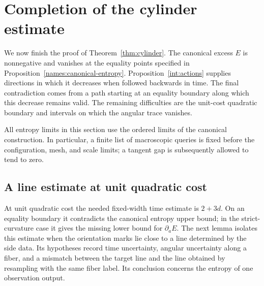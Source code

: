 \section{Completion of the cylinder estimate}\label{act:section}

We now finish the proof of Theorem~\ref{thm:cylinder}.
The canonical excess $E$ is nonnegative and vanishes at the equality
points specified in Proposition~\ref{names:canonical-entropy}.
Proposition~\ref{int:actions} supplies directions in which it decreases
when followed backwards in time. The final contradiction comes from a
path starting at an equality boundary along which this decrease remains
valid. The remaining difficulties are the unit-cost quadratic boundary
and intervals on which the angular trace vanishes.

All entropy limits in this section use the ordered limits of the canonical
construction.  In particular, a finite
list of macroscopic queries is fixed before the configuration, mesh, and
scale limits; a tangent gap is subsequently allowed to tend to zero.

\subsection{A line estimate at unit quadratic cost}

At unit quadratic cost the needed fixed-width time estimate is $2+3d$.
On an equality boundary it contradicts the canonical entropy upper bound;
in the strict-curvature case it gives the missing lower bound for
$\partial_aE$. The next lemma isolates this estimate when the orientation
marks lie close to a line determined by the side data. Its hypotheses
record time uncertainty, angular uncertainty along a fiber, and a mismatch
between the target line and the line obtained by resampling with the same
fiber label. Its conclusion concerns the entropy of one observation output.


